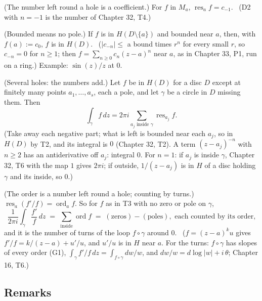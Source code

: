 \begin{lines}
\item[\lab{T1}] (The number left round a hole is a coefficient.) For $f$ in $M_a$, $\operatorname{res}_a f = c_{-1}$. \ (D2 with $n = -1$ is the number of Chapter 32, T4.)
\item[\lab{T2}] (Bounded means no pole.) If $f$ is in $H(D \setminus \{a\})$ and bounded near $a$, then, with $f(a) := c_0$, $f$ is in $H(D)$. \ ($|c_{-n}| \le$ a bound times $r^n$ for every small $r$, so $c_{-n} = 0$ for $n \ge 1$; then $f = \sum_{n \ge 0} c_n (z - a)^n$ near $a$, as in Chapter 33, P1, run on a ring.) Example: $\sin(z)/z$ at $0$.
\item[\lab{T3}] (Several holes: the numbers add.) Let $f$ be in $H(D)$ for a disc $D$ except at finitely many points $a_1, \dots, a_s$, each a pole, and let $\gamma$ be a circle in $D$ missing them. Then \[ \int_\gamma f\,dz = 2\pi i \sum_{a_j \text{ inside } \gamma} \operatorname{res}_{a_j} f . \] (Take away each negative part; what is left is bounded near each $a_j$, so in $H(D)$ by T2, and its integral is $0$ (Chapter 32, T2). A term $(z - a_j)^{-n}$ with $n \ge 2$ has an antiderivative off $a_j$: integral $0$. For $n = 1$: if $a_j$ is inside $\gamma$, Chapter 32, T6 with the map $1$ gives $2\pi i$; if outside, $1/(z - a_j)$ is in $H$ of a disc holding $\gamma$ and its inside, so $0$.)
\item[\lab{T4}] (The order is a number left round a hole; counting by turns.) $\operatorname{res}_a (f'/f) = \operatorname{ord}_a f$. So for $f$ as in T3 with no zero or pole on $\gamma$, \[ \frac{1}{2\pi i}\int_\gamma \frac{f'}{f}\,dz \;=\; \sum_{\text{inside}} \operatorname{ord} f \;=\; (\text{zeros}) - (\text{poles}), \text{ each counted by its order,} \] and it is the number of turns of the loop $f \circ \gamma$ around $0$. \ ($f = (z - a)^k u$ gives $f'/f = k/(z - a) + u'/u$, and $u'/u$ is in $H$ near $a$. For the turns: $f \circ \gamma$ has slopes of every order (G1), $\int_\gamma f'/f\,dz = \int_{f \circ \gamma} dw/w$, and $dw/w = d\log|w| + i\,\theta$; Chapter 16, T6.)
\end{lines}

\subsection*{Remarks}


